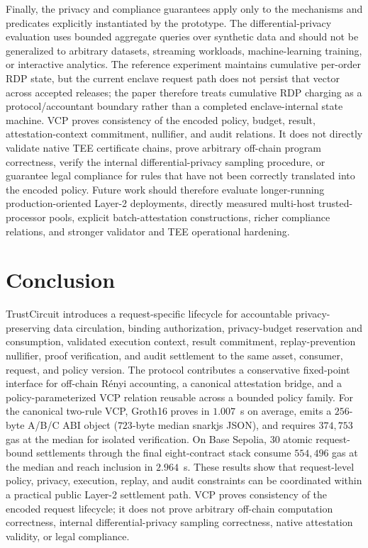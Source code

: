 \documentclass[10pt,journal,compsoc]{IEEEtran}
\begin{document}
Finally, the privacy and compliance guarantees apply only to the mechanisms and predicates explicitly instantiated by the prototype. The differential-privacy evaluation uses bounded aggregate queries over synthetic data and should not be generalized to arbitrary datasets, streaming workloads, machine-learning training, or interactive analytics. The reference experiment maintains cumulative per-order RDP state, but the current enclave request path does not persist that vector across accepted releases; the paper therefore treats cumulative RDP charging as a protocol/accountant boundary rather than a completed enclave-internal state machine. VCP proves consistency of the encoded policy, budget, result, attestation-context commitment, nullifier, and audit relations. It does not directly validate native TEE certificate chains, prove arbitrary off-chain program correctness, verify the internal differential-privacy sampling procedure, or guarantee legal compliance for rules that have not been correctly translated into the encoded policy. Future work should therefore evaluate longer-running production-oriented Layer-2 deployments, directly measured multi-host trusted-processor pools, explicit batch-attestation constructions, richer compliance relations, and stronger validator and TEE operational hardening.

\section{Conclusion}
\label{sec:conclusion}

TrustCircuit introduces a request-specific lifecycle for accountable privacy-preserving data circulation, binding authorization, privacy-budget reservation and consumption, validated execution context, result commitment, replay-prevention nullifier, proof verification, and audit settlement to the same asset, consumer, request, and policy version. The protocol contributes a conservative fixed-point interface for off-chain R\'enyi accounting, a canonical attestation bridge, and a policy-parameterized VCP relation reusable across a bounded policy family. For the canonical two-rule VCP, Groth16 proves in $1.007$~s on average, emits a $256$-byte A/B/C ABI object ($723$-byte median snarkjs JSON), and requires $374{,}753$ gas at the median for isolated verification. On Base Sepolia, $30$ atomic request-bound settlements through the final eight-contract stack consume $554{,}496$ gas at the median and reach inclusion in $2.964$~s. These results show that request-level policy, privacy, execution, replay, and audit constraints can be coordinated within a practical public Layer-2 settlement path. VCP proves consistency of the encoded request lifecycle; it does not prove arbitrary off-chain computation correctness, internal differential-privacy sampling correctness, native attestation validity, or legal compliance.
\end{document}
